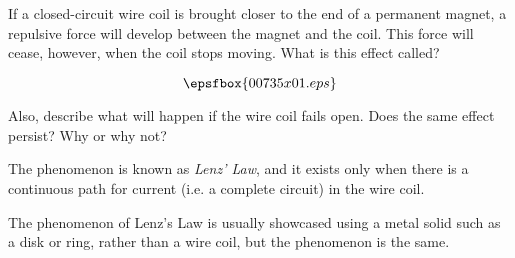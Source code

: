 

If a closed-circuit wire coil is brought closer to the end of a permanent magnet, a repulsive force will develop between the magnet and the coil.  This force will cease, however, when the coil stops moving.  What is this effect called?

$$\epsfbox{00735x01.eps}$$

Also, describe what will happen if the wire coil fails open.  Does the same effect persist?  Why or why not?







The phenomenon is known as {\it Lenz' Law}, and it exists only when there is a continuous path for current (i.e. a complete circuit) in the wire coil.







The phenomenon of Lenz's Law is usually showcased using a metal solid such as a disk or ring, rather than a wire coil, but the phenomenon is the same.





